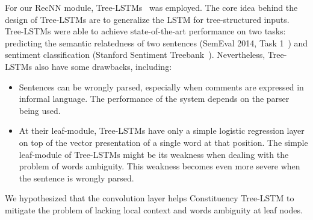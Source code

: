 For our RecNN module, Tree-LSTMs~\cite{treeLSTM} was employed.
The core idea behind the design of Tree-LSTMs are to generalize the LSTM for tree-structured inputs.
Tree-LSTMs were able to achieve state-of-the-art performance on two tasks: predicting the semantic relatedness of two sentences (SemEval 2014, Task 1~\cite{SemeEvalTask1}) and sentiment classification (Stanford Sentiment Treebank~\cite{socher2013recursive}).
Nevertheless, Tree-LSTMs also have some drawbacks, including:
\begin{itemize}
	\item Sentences can be wrongly parsed, especially when comments are expressed in informal language.
	The performance of the system depends on the parser being used.
	\item At their leaf-module, Tree-LSTMs have only a simple logistic regression layer on top of the vector presentation of a single word at that position.
	The simple leaf-module of Tree-LSTMs might be its weakness when dealing with the problem of words ambiguity.
	This weakness becomes even more severe when the sentence is wrongly parsed.
\end{itemize}
We hypothesized that the convolution layer helps Constituency Tree-LSTM to mitigate the problem of lacking local context and words ambiguity at leaf nodes.
